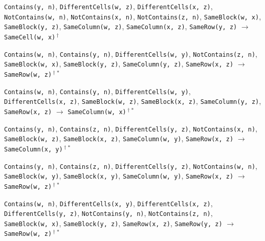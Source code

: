 \documentclass[11pt,a4paper]{article}
\theoremstyle{definition}
\theoremstyle{remark}
\begin{document}
{\begin{enumerate}[label={[\arabic*]},leftmargin=2.6em,itemsep=1pt]
  \item \texttt{Contains(y,~n)}, \allowbreak \texttt{DifferentCells(w,~z)}, \allowbreak \texttt{DifferentCells(x,~z)}, \allowbreak \texttt{NotContains(w,~n)}, \allowbreak \texttt{NotContains(x,~n)}, \allowbreak \texttt{NotContains(z,~n)}, \allowbreak \texttt{SameBlock(w,~x)}, \allowbreak \texttt{SameBlock(y,~z)}, \allowbreak \texttt{SameColumn(w,~z)}, \allowbreak \texttt{SameColumn(x,~z)}, \allowbreak \texttt{SameRow(y,~z)} \;$\to$\; \texttt{SameCell(w,~x)}\,$^{\dagger}$
  \item \texttt{Contains(w,~n)}, \allowbreak \texttt{Contains(y,~n)}, \allowbreak \texttt{DifferentCells(w,~y)}, \allowbreak \texttt{NotContains(z,~n)}, \allowbreak \texttt{SameBlock(w,~x)}, \allowbreak \texttt{SameBlock(y,~z)}, \allowbreak \texttt{SameColumn(y,~z)}, \allowbreak \texttt{SameRow(x,~z)} \;$\to$\; \texttt{SameRow(w,~z)}\,$^{\dagger}$\,$^{\ast}$
  \item \texttt{Contains(w,~n)}, \allowbreak \texttt{Contains(y,~n)}, \allowbreak \texttt{DifferentCells(w,~y)}, \allowbreak \texttt{DifferentCells(x,~z)}, \allowbreak \texttt{SameBlock(w,~z)}, \allowbreak \texttt{SameBlock(x,~z)}, \allowbreak \texttt{SameColumn(y,~z)}, \allowbreak \texttt{SameRow(x,~z)} \;$\to$\; \texttt{SameColumn(w,~x)}\,$^{\dagger}$\,$^{\ast}$
  \item \texttt{Contains(y,~n)}, \allowbreak \texttt{Contains(z,~n)}, \allowbreak \texttt{DifferentCells(y,~z)}, \allowbreak \texttt{NotContains(x,~n)}, \allowbreak \texttt{SameBlock(w,~z)}, \allowbreak \texttt{SameBlock(x,~z)}, \allowbreak \texttt{SameColumn(w,~y)}, \allowbreak \texttt{SameRow(x,~z)} \;$\to$\; \texttt{SameColumn(x,~y)}\,$^{\dagger}$\,$^{\ast}$
  \item \texttt{Contains(y,~n)}, \allowbreak \texttt{Contains(z,~n)}, \allowbreak \texttt{DifferentCells(y,~z)}, \allowbreak \texttt{NotContains(w,~n)}, \allowbreak \texttt{SameBlock(w,~y)}, \allowbreak \texttt{SameBlock(x,~y)}, \allowbreak \texttt{SameColumn(w,~y)}, \allowbreak \texttt{SameRow(x,~z)} \;$\to$\; \texttt{SameRow(w,~z)}\,$^{\dagger}$\,$^{\ast}$
  \item \texttt{Contains(w,~n)}, \allowbreak \texttt{DifferentCells(x,~y)}, \allowbreak \texttt{DifferentCells(x,~z)}, \allowbreak \texttt{DifferentCells(y,~z)}, \allowbreak \texttt{NotContains(y,~n)}, \allowbreak \texttt{NotContains(z,~n)}, \allowbreak \texttt{SameBlock(w,~x)}, \allowbreak \texttt{SameBlock(y,~z)}, \allowbreak \texttt{SameRow(x,~z)}, \allowbreak \texttt{SameRow(y,~z)} \;$\to$\; \texttt{SameRow(w,~z)}\,$^{\dagger}$\,$^{\ast}$

\end{enumerate}}
\end{document}
